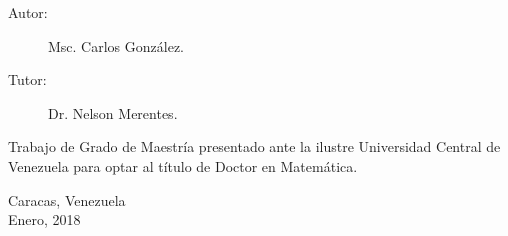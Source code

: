 \begin{titlepage}
\begin{large}
\vspace{1cm}

\begin{description}
\item[Autor:] Msc. Carlos Gonz\'alez.
\item[Tutor:] Dr. Nelson Merentes.
\end{description}

\begin{flushright}
\begin{minipage}[b][5cm][b]{0,45\textwidth}
Trabajo de Grado de Maestría presentado
ante la ilustre Universidad Central de 
Venezuela para optar al título de Doctor en Matemática.
\end{minipage}
\end{flushright}

\begin{center}

Caracas, Venezuela \\ Enero, 2018

\end{center}

\end{large}

\end{titlepage}

%
%
%
%
%
%
%
%
%
%
%
%
%
%
%

